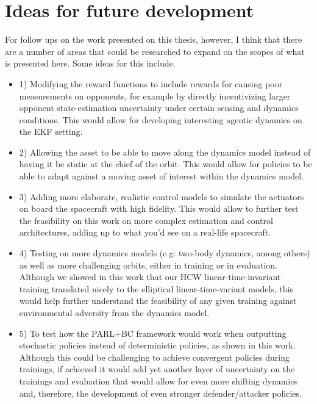 \section{Ideas for future development}
\label{sec:future-development}

For follow ups on the work presented on this thesis, however, I think that there are a number of areas that could be  researched to expand on the scopes of what is presented here. Some ideas for this include.

\begin{itemize}

    \item 1) Modifying the reward functions to include rewards for causing poor measurements on opponents, for example by directly incentivizing larger opponent state-estimation uncertainty under certain sensing and dynamics conditions. This would allow for developing interesting agentic dynamics on the EKF setting.

    \item 2) Allowing the asset to be able to move along the dynamics model instead of having it be static at the chief of the orbit. This would allow for policies to be able to adapt against a moving asset of interest within the dynamics model.

    \item 3) Adding more elaborate, realistic control models to simulate the actuators on board the spacecraft with high fidelity. This would allow to further test the feasibility on this work on more complex estimation and control architectures, adding up to what you'd see on a real-life spacecraft.

    \item 4) Testing on more dynamics models (e.g: two-body dynamics, among others) as well as more challenging orbits, either in training or in evaluation. Although we showed in this work that our HCW linear-time-invariant training translated nicely to the elliptical linear-time-variant models, this would help further understand the feasibility of any given training against environmental adversity from the dynamics model.

    \item 5) To test how the PARL+BC framework would work when outputting stochastic policies instead of deterministic policies, as shown in this work. Although this could be challenging to achieve convergent policies during trainings, if achieved it would add yet another layer of uncertainty on the trainings and evaluation that would allow for even more shifting dynamics and, therefore, the development of even stronger defender/attacker policies.
\end{itemize}


